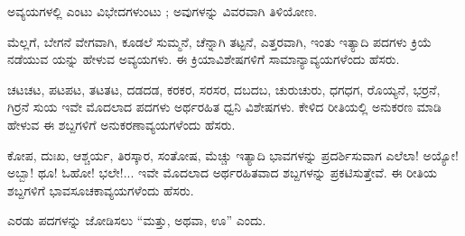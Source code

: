 \indent ಅವ್ಯಯಗಳಲ್ಲಿ ಎಂಟು ವಿಭೇದಗಳುಂಟು ; ಅವುಗಳನ್ನು ವಿವರವಾಗಿ ತಿಳಿಯೋಣ.\par

\vspace{4pt plus 4pt minus 1pt}\hspace{0.5em}ಮೆಲ್ಲಗೆ, ಬೇಗನೆ ವೇಗವಾಗಿ, ಕೂಡಲೆ ಸುಮ್ಮನೆ, ಚೆನ್ನಾಗಿ ತಟ್ಟನೆ, ಎತ್ತರವಾಗಿ, ಇಂತು ಇತ್ಯಾದಿ ಪದಗಳು ಕ್ರಿಯೆ ನಡೆಯುವ ಯನ್ನು ಹೇಳುವ ಅವ್ಯಯಗಳು. ಈ ಕ್ರಿಯಾವಿಶೇಷಗಳಿಗೆ ಸಾಮಾನ್ಯಾವ್ಯಯಗಳೆಂದು ಹೆಸರು.\par

\vspace{4pt plus 4pt minus 1pt}\hspace{0.5em}ಚಟಚಟ, ಪಟಪಟ, ತಟತಟ, ದಡದಡ, ಕರಕರ, ಸರಸರ, ದಬದಬ, ಚುರುಚುರು, ಧಗಧಗ, ರೊಯ್ಯನೆ, ಭರ್ರನೆ, ಗಿರ್ರನೆ ಸುಯ ಇವೇ ಮೊದಲಾದ ಪದಗಳು ಅರ್ಥರಹಿತ ಧ್ವನಿ ವಿಶೇಷಗಳು. ಕೇಳಿದ ರೀತಿಯಲ್ಲಿ ಅನುಕರಣ ಮಾಡಿ ಹೇಳುವ ಈ ಶಬ್ದಗಳಿಗೆ ಅನುಕರಣಾವ್ಯಯಗಳೆಂದು ಹೆಸರು.\par

\vspace{4pt plus 4pt minus 1pt}\hspace{0.5em}ಕೋಪ, ದುಃಖ, ಆಶ್ಚರ್ಯ, ತಿರಸ್ಕಾರ, ಸಂತೋಷ, ಮೆಚ್ಚು ಇತ್ಯಾದಿ ಭಾವಗಳನ್ನು ಪ್ರದರ್ಶಿಸುವಾಗ ಎಲೆಲಾ! ಅಯ್ಯೋ! ಅಬ್ಬಾ! ಥೂ! ಓಹೋ! ಭಲೇ!... ಇವೇ ಮೊದಲಾದ ಅರ್ಥರಹಿತವಾದ ಶಬ್ದಗಳನ್ನು ಪ್ರಕಟಿಸುತ್ತೇವೆ. ಈ ರೀತಿಯ ಶಬ್ದಗಳಿಗೆ ಭಾವಸೂಚಕಾವ್ಯಯಗಳೆಂದು ಹೆಸರು.\par



\vspace{4pt plus 4pt minus 1pt}\hspace{0.5em}ಎರಡು ಪದಗಳನ್ನು ಜೋಡಿಸಲು “ಮತ್ತು, ಅಥವಾ, ಊ” ಎಂದು.\par
